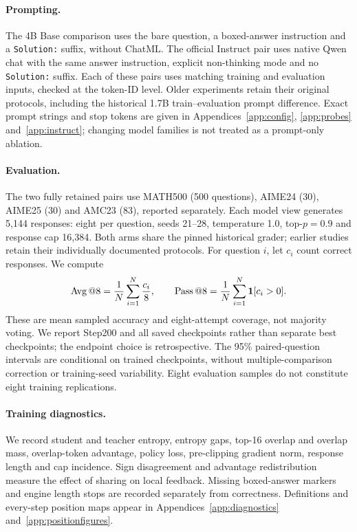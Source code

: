 \paragraph{Prompting.}
The 4B Base comparison uses the bare question, a boxed-answer instruction and a \texttt{Solution:} suffix, without ChatML. The official Instruct pair uses native Qwen chat with the same answer instruction, explicit non-thinking mode and no \texttt{Solution:} suffix. Each of these pairs uses matching training and evaluation inputs, checked at the token-ID level. Older experiments retain their original protocols, including the historical 1.7B train--evaluation prompt difference. Exact prompt strings and stop tokens are given in Appendices~\ref{app:config}, \ref{app:probes} and~\ref{app:instruct}; changing model families is not treated as a prompt-only ablation.

\paragraph{Evaluation.}
The two fully retained pairs use MATH500 (500 questions), AIME24 (30), AIME25 (30) and AMC23 (83), reported separately. Each model view generates 5,144 responses: eight per question, seeds 21--28, temperature 1.0, top-$p=0.9$ and response cap 16,384. Both arms share the pinned historical grader; earlier studies retain their individually documented protocols. For question $i$, let $c_i$ count correct responses. We compute
\begin{equation}
 \operatorname{Avg}@8=\frac{1}{N}\sum_{i=1}^N\frac{c_i}{8},\qquad
 \operatorname{Pass}@8=\frac{1}{N}\sum_{i=1}^N\mathbf{1}[c_i>0].
 \label{eq:metrics}
\end{equation}
These are mean sampled accuracy and eight-attempt coverage, not majority voting. We report Step200 and all saved checkpoints rather than separate best checkpoints; the endpoint choice is retrospective. The 95\% paired-question intervals are conditional on trained checkpoints, without multiple-comparison correction or training-seed variability. Eight evaluation samples do not constitute eight training replications.

\paragraph{Training diagnostics.}
We record student and teacher entropy, entropy gaps, top-16 overlap and overlap mass, overlap-token advantage, policy loss, pre-clipping gradient norm, response length and cap incidence. Sign disagreement and advantage redistribution measure the effect of sharing on local feedback. Missing boxed-answer markers and engine length stops are recorded separately from correctness. Definitions and every-step position maps appear in Appendices~\ref{app:diagnostics} and~\ref{app:positionfigures}.
